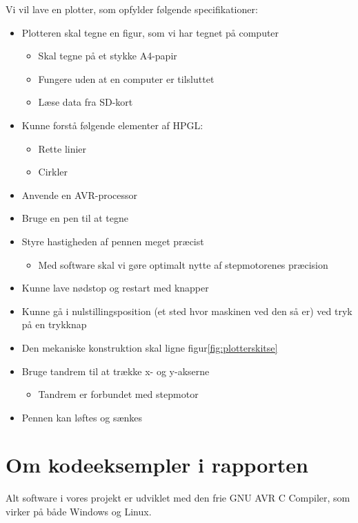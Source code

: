 Vi vil lave en plotter, som opfylder følgende specifikationer:
\begin{itemize}
\item Plotteren skal tegne en figur, som vi har tegnet på computer
\begin{itemize}
\item Skal tegne på et stykke A4-papir
\item Fungere uden at en computer er tilsluttet
\item Læse data fra SD-kort
\end{itemize}
\item Kunne forstå følgende elementer af HPGL:
\begin{itemize}
\item Rette linier
\item Cirkler
\end{itemize}
\item Anvende en AVR-processor
\item Bruge en pen til at tegne
\item Styre hastigheden af pennen meget præcist
\begin{itemize}
\item Med software skal vi gøre optimalt nytte af stepmotorenes præcision
\end{itemize}
\item Kunne lave nødstop og restart med knapper
\item Kunne gå i nulstillingsposition (et sted hvor maskinen ved den så er) ved tryk på en trykknap
\item Den mekaniske konstruktion skal ligne figur\vref{fig:plotterskitse}
\item Bruge tandrem til at trække x- og y-akserne
\begin{itemize}
\item Tandrem er forbundet med stepmotor
\end{itemize}
\item Pennen kan løftes og sænkes

\end{itemize}

\section{Om kodeeksempler i rapporten}
Alt software i vores projekt er udviklet med den frie GNU AVR C Compiler, som virker på både Windows og Linux.


